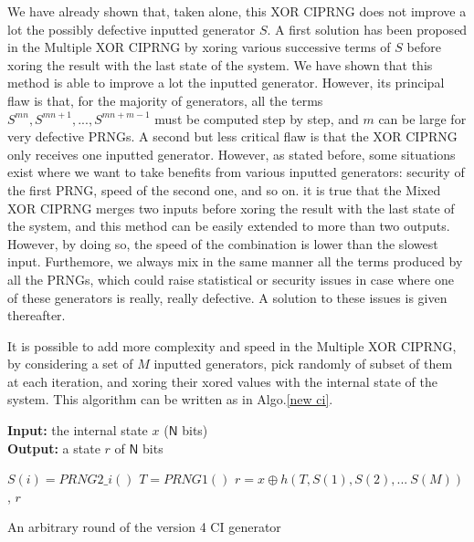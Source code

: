 We have already shown that, taken alone, this XOR CIPRNG does not improve a lot
the possibly defective inputted generator $S$. A first solution has been proposed
in the Multiple XOR CIPRNG by xoring various successive terms of $S$ before xoring
the result with the last state of the system. We have shown that this method
is able to improve a lot the inputted generator. However, its principal flaw is
that, for the majority of generators, all the terms 
$S^{mn},S^{mn+1},...,S^{mn+m-1}$ must be computed step by step, and $m$ can be
large for very defective PRNGs. A second but less critical flaw is that the XOR
CIPRNG only receives one inputted generator. However, as stated before, some situations exist where we want
to take benefits from various inputted generators: security of the first PRNG, speed of the second one, and so on. it is true that the Mixed XOR CIPRNG merges two inputs
before xoring the result with the last state of the system, and this method can
be easily extended to more than two outputs. However, by doing so, the speed of the
combination is lower than the slowest input. Furthemore, we always mix in the same
manner all the terms produced by all the PRNGs, which could raise statistical or
security issues in case where one of these generators is really, really defective.
A solution to these issues is given thereafter.




It is possible to add more complexity and speed in the Multiple XOR
CIPRNG, by considering a set of $M$ inputted generators, pick randomly
of subset of them at each iteration, and xoring their xored values with the
internal state of the system.
This algorithm can be written as in Algo.\ref{new ci}.
\begin{algorithm}
\textbf{Input:} the internal state $x$ ($\mathsf{N}$ bits)\\
\textbf{Output:} a state $r$ of $\mathsf{N}$ bits
\begin{algorithmic}[1]
{
\STATE$S(i)= PRNG2\_i()$\;
}
\ENDFOR
\STATE$T = PRNG1()$\;
\STATE$r = x \oplus h(T,S(1),S(2),...~S(M))$,
\RETURN $r$\;
\medskip
\caption{An arbitrary round of the version 4 CI generator}
\label{new ci}
\end{algorithmic}
\end{algorithm}

